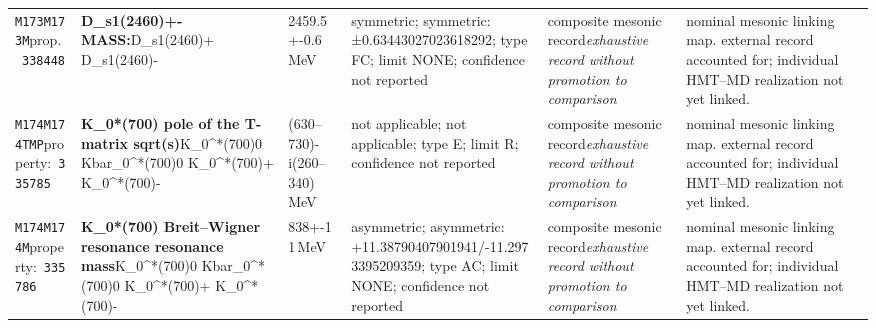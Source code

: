 \begin{landscape}
\begin{longtable}{L{1.85cm}L{4.45cm}L{2.35cm}L{4.05cm}L{3.35cm}L{7.15cm}}
\texttt{M173}\newline \texttt{M173M}\newline prop.\ \texttt{338448} & \textbf{D\_\allowbreak{}s1(2460)+- MASS:}\newline D\_\allowbreak{}s1(2460)+ \textbar{}\allowbreak{} D\_\allowbreak{}s1(2460)- & 2459.5+-0.6\,MeV & symmetric; symmetric: ±0.63443027023618292; type FC; limit NONE; confidence not reported & composite mesonic record\newline \emph{exhaustive record without promotion to comparison} & nominal mesonic linking map. external record accounted for; individual HMT--MD realization not yet linked. \\
\texttt{M174}\newline \texttt{M174TMP}\newline property:\ \texttt{335785} & \textbf{K\_\allowbreak{}0*(700) pole of the T-matrix sqrt(s)}\newline K\_\allowbreak{}0\textasciicircum{}*(700)0 \textbar{}\allowbreak{} Kbar\_\allowbreak{}0\textasciicircum{}*(700)0 \textbar{}\allowbreak{} K\_\allowbreak{}0\textasciicircum{}*(700)+ \textbar{}\allowbreak{} K\_\allowbreak{}0\textasciicircum{}*(700)- & (630--730)-i(260--340)\,MeV & not applicable; not applicable; type E; limit R; confidence not reported & composite mesonic record\newline \emph{exhaustive record without promotion to comparison} & nominal mesonic linking map. external record accounted for; individual HMT--MD realization not yet linked. \\
\texttt{M174}\newline \texttt{M174M}\newline property:\ \texttt{335786} & \textbf{K\_\allowbreak{}0*(700) Breit--Wigner resonance resonance mass}\newline K\_\allowbreak{}0\textasciicircum{}*(700)0 \textbar{}\allowbreak{} Kbar\_\allowbreak{}0\textasciicircum{}*(700)0 \textbar{}\allowbreak{} K\_\allowbreak{}0\textasciicircum{}*(700)+ \textbar{}\allowbreak{} K\_\allowbreak{}0\textasciicircum{}*(700)- & 838+-11\,MeV & asymmetric; asymmetric: +11.38790407901941/-11.2973395209359; type AC; limit NONE; confidence not reported & composite mesonic record\newline \emph{exhaustive record without promotion to comparison} & nominal mesonic linking map. external record accounted for; individual HMT--MD realization not yet linked. \\

\end{longtable}
\end{landscape}

